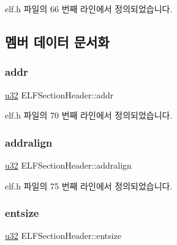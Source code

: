 elf.\+h 파일의 66 번째 라인에서 정의되었습니다.



\subsection{멤버 데이터 문서화}
\mbox{\label{struct_e_l_f_section_header_afc725f235fad23731a2440a008eb47d0}} 
\subsubsection{\texorpdfstring{addr}{addr}}
{\footnotesize\ttfamily \mbox{\hyperlink{_system_8h_a10e94b422ef0c20dcdec20d31a1f5049}{u32}} E\+L\+F\+Section\+Header\+::addr}



elf.\+h 파일의 70 번째 라인에서 정의되었습니다.

\mbox{\label{struct_e_l_f_section_header_a373d42b2260c33d6c03eb14f0a76ec42}} 
\subsubsection{\texorpdfstring{addralign}{addralign}}
{\footnotesize\ttfamily \mbox{\hyperlink{_system_8h_a10e94b422ef0c20dcdec20d31a1f5049}{u32}} E\+L\+F\+Section\+Header\+::addralign}



elf.\+h 파일의 75 번째 라인에서 정의되었습니다.

\mbox{\label{struct_e_l_f_section_header_a87a3476993e99119cc8a46f4ec099fc1}} 
\subsubsection{\texorpdfstring{entsize}{entsize}}
{\footnotesize\ttfamily \mbox{\hyperlink{_system_8h_a10e94b422ef0c20dcdec20d31a1f5049}{u32}} E\+L\+F\+Section\+Header\+::entsize}



